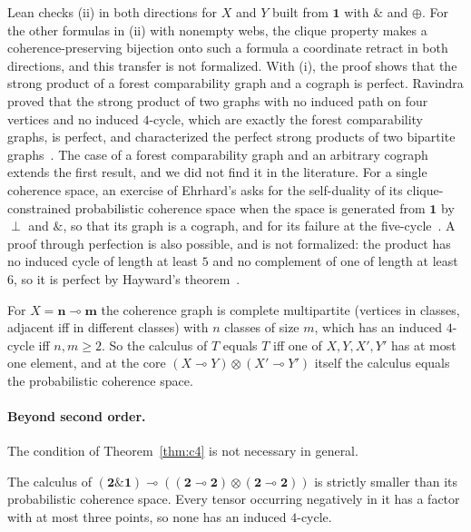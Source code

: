 Lean checks (ii) in both directions for $X$ and $Y$ built from
$\mathbf{1}$ with $\mathbin{\&}$ and $\oplus$. For
the other formulas in (ii) with nonempty webs, the clique property makes
a coherence-preserving bijection onto such a formula a coordinate retract
in both directions, and this transfer is not formalized. With (i), the
proof shows that the strong product of a forest comparability graph and
a cograph is perfect. Ravindra proved that the strong product of two
graphs with no induced path on four vertices and no induced $4$-cycle,
which are exactly the forest comparability graphs, is perfect, and
characterized the perfect strong products of two bipartite
graphs~\cite{ravindra1978}. The case of a forest comparability graph and
an arbitrary cograph extends the first result, and we did not find it in
the literature. For a single coherence space, an exercise of Ehrhard's
asks for the self-duality of its clique-constrained probabilistic
coherence space when the space is generated from $\mathbf{1}$ by
$\perp$ and $\mathbin{\&}$, so that its graph is a cograph, and for its
failure at the five-cycle~\cite{ehrhard-td2}. A proof through perfection is also
possible, and is not formalized: the product has no induced cycle of
length at least $5$ and no complement of one of length at least $6$, so
it is perfect by Hayward's theorem~\cite{hayward1985}.

For $X = \mathbf{n} \multimap \mathbf{m}$ the coherence graph is complete
multipartite (vertices in classes, adjacent iff in different classes)
with $n$ classes of size $m$, which has an induced $4$-cycle
iff $n, m \ge 2$. So the calculus of $T$ equals $T$ iff one of $X, Y, X',
Y'$ has at most one element, and at the core $(X \multimap Y) \otimes
(X' \multimap Y')$ itself the calculus equals the probabilistic coherence
space.

\paragraph{Beyond second order.}
The condition of Theorem~\ref{thm:c4} is not necessary in general.

\begin{proposition}
\label{prop:f3}
The calculus of $(\mathbf{2} \mathbin{\&} \mathbf{1}) \multimap
((\mathbf{2} \multimap \mathbf{2}) \otimes (\mathbf{2} \multimap
\mathbf{2}))$ is strictly smaller than its probabilistic coherence space.
Every tensor occurring negatively in it has a factor with at most three
points, so none has an induced $4$-cycle.
\end{proposition}


